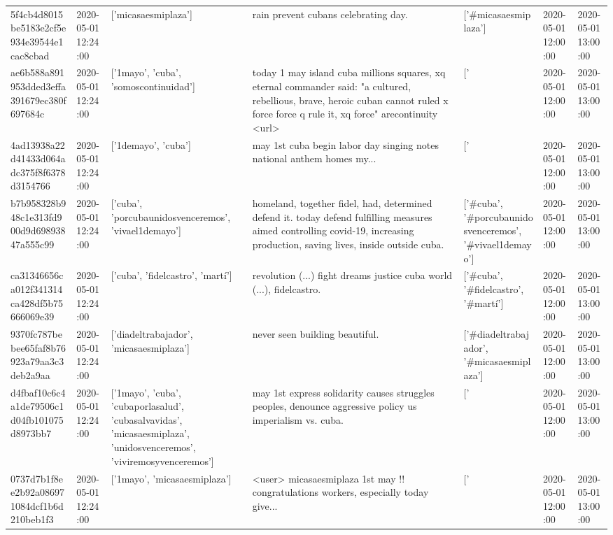 \begin{tabular}{lllllll}
5f4cb4d8015be5183e2cf5e934e39544e1cac8cbad & 2020-05-01 12:24:00 & ['micasaesmiplaza'] & rain prevent cubans celebrating day. & ['#micasaesmiplaza'] & 2020-05-01 12:00:00 & 2020-05-01 13:00:00 \\
ae6b588a891953dded3effa391679ec380f697684c & 2020-05-01 12:24:00 & ['1mayo', 'cuba', 'somoscontinuidad'] & today 1 may island cuba millions squares, xq eternal commander said: "a cultured, rebellious, brave, heroic cuban cannot ruled x force force q rule it, xq force" arecontinuity <url> & ['#1mayo', '#cuba', '#somoscontinuidad'] & 2020-05-01 12:00:00 & 2020-05-01 13:00:00 \\
4ad13938a22d41433d064adc375f8f6378d3154766 & 2020-05-01 12:24:00 & ['1demayo', 'cuba'] & may 1st cuba begin labor day singing notes national anthem homes my... & ['#1demayo', '#cuba'] & 2020-05-01 12:00:00 & 2020-05-01 13:00:00 \\
b7b958328b948c1e313fd900d9d69893847a555c99 & 2020-05-01 12:24:00 & ['cuba', 'porcubaunidosvenceremos', 'vivael1demayo'] & homeland, together fidel, had, determined defend it. today defend fulfilling measures aimed controlling covid-19, increasing production, saving lives, inside outside cuba. & ['#cuba', '#porcubaunidosvenceremos', '#vivael1demayo'] & 2020-05-01 12:00:00 & 2020-05-01 13:00:00 \\
ca31346656ca012f341314ca428df5b75666069e39 & 2020-05-01 12:24:00 & ['cuba', 'fidelcastro', 'martí'] & revolution (...) fight dreams justice cuba world (...), fidelcastro. & ['#cuba', '#fidelcastro', '#martí'] & 2020-05-01 12:00:00 & 2020-05-01 13:00:00 \\
9370fc787bebee65faf8b76923a79aa3c3deb2a9aa & 2020-05-01 12:24:00 & ['diadeltrabajador', 'micasaesmiplaza'] & never seen building beautiful. & ['#diadeltrabajador', '#micasaesmiplaza'] & 2020-05-01 12:00:00 & 2020-05-01 13:00:00 \\
d4fbaf10c6c4a1de79506c1d04fb101075d8973bb7 & 2020-05-01 12:24:00 & ['1mayo', 'cuba', 'cubaporlasalud', 'cubasalvavidas', 'micasaesmiplaza', 'unidosvenceremos', 'viviremosyvenceremos'] & may 1st express solidarity causes struggles peoples, denounce aggressive policy us imperialism vs. cuba. & ['#1mayo', '#cuba', '#cubaporlasalud', '#cubasalvavidas', '#micasaesmiplaza', '#unidosvenceremos', '#viviremosyvenceremos'] & 2020-05-01 12:00:00 & 2020-05-01 13:00:00 \\
0737d7b1f8ee2b92a086971084dcf1b6d210beb1f3 & 2020-05-01 12:24:00 & ['1mayo', 'micasaesmiplaza'] & <user> micasaesmiplaza 1st may !!️ congratulations workers, especially today give... & ['#1mayo', '#micasaesmiplaza'] & 2020-05-01 12:00:00 & 2020-05-01 13:00:00 \\

\end{tabular}
